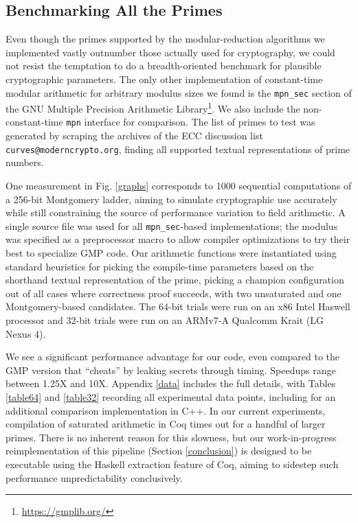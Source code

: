 \documentclass[conference,letterpaper]{IEEEtran}
\begin{document}


\subsection{Benchmarking All the Primes}\label{instantiate}

Even though the primes supported by the modular-reduction algorithms we implemented vastly outnumber those actually used for cryptography, we could not resist the temptation to do a breadth-oriented benchmark for plausible cryptographic parameters.
The only other implementation of constant-time modular arithmetic for arbitrary modulus sizes we found is the \verb|mpn_sec| section of the GNU Multiple Precision Arithmetic Library\footnote{\url{https://gmplib.org/}}.
We also include the non-constant-time \texttt{mpn} interface for comparison.
The list of primes to test was generated by scraping the archives of the ECC discussion list \texttt{curves@moderncrypto.org}, finding all supported textual representations of prime numbers.

One measurement in Fig. \ref{graphs} corresponds to 1000 sequential computations of a 256-bit Montgomery ladder, aiming to simulate cryptographic use accurately while still constraining the source of performance variation to field arithmetic.
A single source file was used for all \verb|mpn_sec|-based implementations; the modulus was specified as a preprocessor macro to allow compiler optimizations to try their best to specialize GMP code.
Our arithmetic functions were instantiated using standard heuristics for picking the compile-time parameters based on the shorthand textual representation of the prime, picking a champion configuration out of all cases where correctness proof succeeds, with two unsaturated and one Montgomery-based candidates.
The 64-bit trials were run on an x86 Intel Haswell processor and 32-bit trials were run on an ARMv7-A Qualcomm Krait (LG Nexus 4).

We see a significant performance advantage for our code, even compared to the GMP version that ``cheats'' by leaking secrets through timing.
Speedups range between 1.25X and 10X.
Appendix \ref{data} includes the full details, with Tables \ref{table64} and \ref{table32} recording all experimental data points, including for an additional comparison implementation in C++.
In our current experiments, compilation of saturated arithmetic in Coq times out for a handful of larger primes.
There is no inherent reason for this slowness, but our work-in-progress reimplementation of this pipeline (Section \ref{conclusion}) is designed to be executable using the Haskell extraction feature of Coq,
aiming to sidestep such performance unpredictability conclusively.
\end{document}

